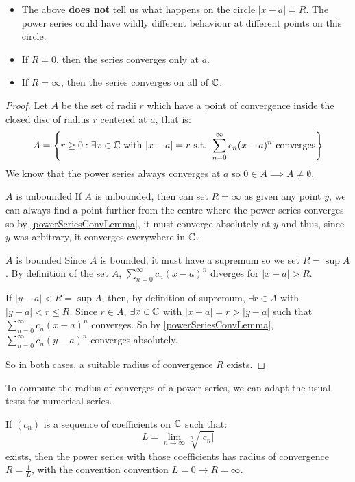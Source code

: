 \documentclass[../main.tex]{subfiles}
\begin{document}
\begin{remark}[Remarks]
  \begin{itemize}
    \item The above \textbf{does not} tell us what happens on the circle $|x - a| = R$.
      The power series could have wildly different behaviour at different points on this circle.
    \item If $R = 0$, then the series converges only at $a$.
    \item If $R = \infty$, then the series converges on all of $\mathbb{C}$.
  \end{itemize}
\end{remark}
\begin{proof}
  Let $A$ be the set of radii $r$ which have a point of convergence inside the closed disc of radius $r$ centered at $a$, that is:
  \[
    A = \left\{r \geq 0 : \exists x \in \mathbb{C} \text{ with } |x - a| = r \text{ s.t. } \sum_{n = 0}^{\infty} c_n(x - a)^{n} \text{ converges}\right\}
  \]
  We know that the power series always converges at $a$ so $0 \in A \implies A \neq \emptyset$.
  \begin{proofcases}
    \begin{case}{$A$ is unbounded}
      If $A$ is unbounded, then can set $R = \infty$ as given any point $y$, we can always find a point further from the centre where the power series converges so by \cref{powerSeriesConvLemma}, it must converge absolutely at $y$ and thus, since $y$ was arbitrary, it converges everywhere in $\mathbb{C}$.
    \end{case}
    \begin{case}{$A$ is bounded}
      Since $A$ is bounded, it must have a supremum so we set $R = \sup A$.
      By definition of the set $A$, $\sum_{n = 0}^{\infty} c_n(x - a)^{n}$ diverges for $|x - a| > R$.

      If $|y - a| < R = \sup A$, then, by definition of supremum, $\exists r \in A$ with $|y - a| < r \leq R$.
      Since $r \in A$, $\exists x \in \mathbb{C}$ with $|x - a| = r > |y - a|$ such that $\sum_{n = 0}^{\infty} c_n(x - a)^{n}$ converges.
      So by \cref{powerSeriesConvLemma}, $\sum_{n = 0}^{\infty} c_n(y - a)^{n}$ converges absolutely.
    \end{case}
  \end{proofcases}
  So in both cases, a suitable radius of convergence $R$ exists.
\end{proof}
To compute the radius of converges of a power series, we can adapt the usual tests for numerical series.
\begin{proposition}
  If $(c_n)$ is a sequence of coefficients on $\mathbb{C}$ such that:
  \[
    L = \lim_{n \to \infty} \sqrt[n]{|c_n|}
  \]
  exists, then the power series with those coefficients has radius of convergence $R = \frac{1}{L}$, with the convention convention $L = 0 \to R = \infty$.
\end{proposition}
\end{document}
